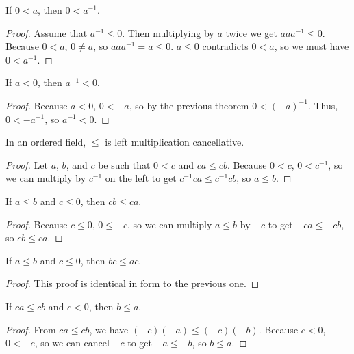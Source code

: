 \documentclass[../../math.tex]{subfiles}
\begin{document}
\begin{theorem}
    If $0 < a$, then $0 < a^{-1}$.
\end{theorem}
\begin{proof}
    Assume that $a^{-1} \leq 0$. Then multiplying by $a$ twice we get $aaa^{-1}
    \leq 0$.  Because $0 < a$, $0 \neq a$, so $aaa^{-1} = a \leq 0$.  $a \leq 0$
    contradicts $0 < a$, so we must have $0 < a^{-1}$.
\end{proof}

\begin{theorem}
    If $a < 0$, then $a^{-1} < 0$.
\end{theorem}
\begin{proof}
    Because $a < 0$, $0 < -a$, so by the previous theorem $0 < (-a)^{-1}$.
    Thus, $0 < -a^{-1}$, so $a^{-1} < 0$.
\end{proof}

\begin{instance}
    In an ordered field, $\leq$ is left multiplication cancellative.
\end{instance}
\begin{proof}
    Let $a$, $b$, and $c$ be such that $0 < c$ and $ca \leq cb$.  Because $0 <
    c$, $0 < c^{-1}$, so we can multiply by $c^{-1}$ on the left to get
    $c^{-1}ca \leq c^{-1}cb$, so $a \leq b$.
\end{proof}

\begin{theorem} \label{le_lmult_neg}
    If $a \leq b$ and $c \leq 0$, then $cb \leq ca$.
\end{theorem}
\begin{proof}
    Because $c \leq 0$, $0 \leq -c$, so we can multiply $a \leq b$ by $-c$ to
    get $-ca \leq -cb$, so $cb \leq ca$.
\end{proof}

\begin{theorem} \label{le_rmult_neg}
    If $a \leq b$ and $c \leq 0$, then $bc \leq ac$.
\end{theorem}
\begin{proof}
    This proof is identical in form to the previous one.
\end{proof}

\begin{theorem} \label{le_mult_lcancel_neg}
    If $ca \leq cb$ and $c < 0$, then $b \leq a$.
\end{theorem}
\begin{proof}
    From $ca \leq cb$, we have $(-c)(-a) \leq (-c)(-b)$.  Because $c < 0$, $0 <
    -c$, so we can cancel $-c$ to get $-a \leq -b$, so $b \leq a$.
\end{proof}
\end{document}
